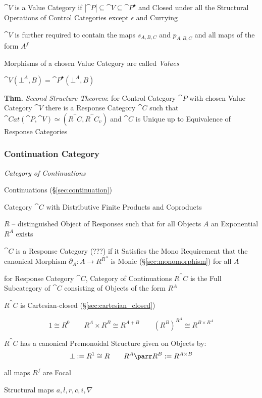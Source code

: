 $\cat{V}$ is a Value Category if $|\cat{P}| \subseteq \cat{V}
\subseteq \cat{P}^\bullet$ and Closed under all the Structural
Operations of Control Categories except $\epsilon$ and Currying

$\cat{V}$ is further required to contain the maps $s_{A,B,C}$ and
$p_{A,B,C}$ and all maps of the form $A^f$

Morphisms of a chosen Value Category are called \emph{Values}

$\cat{V}(\bot^A,B) = \cat{P}^\bullet(\bot^A,B)$

\textbf{Thm.} \emph{Second Structure Theorem}: for Control Category
$\cat{P}$ with chosen Value Category $\cat{V}$ there is a Response
Category $\cat{C}$ such that $\cat{Cat}(\cat{P},\cat{V}) \simeq
(R^\cat{C},R^\cat{C}_v)$ and $\cat{C}$ is Unique up to Equivalence of
Response Categories %



\subsubsection{Continuation Category}\label{sec:continuation_category}

\emph{Category of Continuations}

Continuations (\S\ref{sec:continuation})

Category $\cat{C}$ with Distributive Finite Products and Coproducts

$R$ -- distinguished Object of Responses such that for all Objects $A$
an Exponential $R^A$ exists

$\cat{C}$ is a Response Category (???) if it Satisfies the Mono
Requirement that the canonical Morphism $\partial_A: A \rightarrow
R^{R^A}$ is Monic (\S\ref{sec:monomorphism}) for all $A$

for Response Category $\cat{C}$, Category of Continuations $R^\cat{C}$
is the Full Subcategory of $\cat{C}$ consisting of Objects of the form
$R^A$

$R^\cat{C}$ is Cartesian-closed (\S\ref{sec:cartesian_closed})

\[
  1 \cong R^0 \quad\quad R^A \times R^B \cong R^{A+B} \quad\quad
  (R^B)^{R^A} \cong R^{B \times R^A}
\]

$R^\cat{C}$ has a canonical Premonoidal Structure given on Objects by:
\[
  \bot := R^1 \cong R \quad\quad R^A \parr R^B := R^{A \times B}
\]

all maps $R^f$ are Focal

Structural maps $a,l,r,c,i,\nabla$

